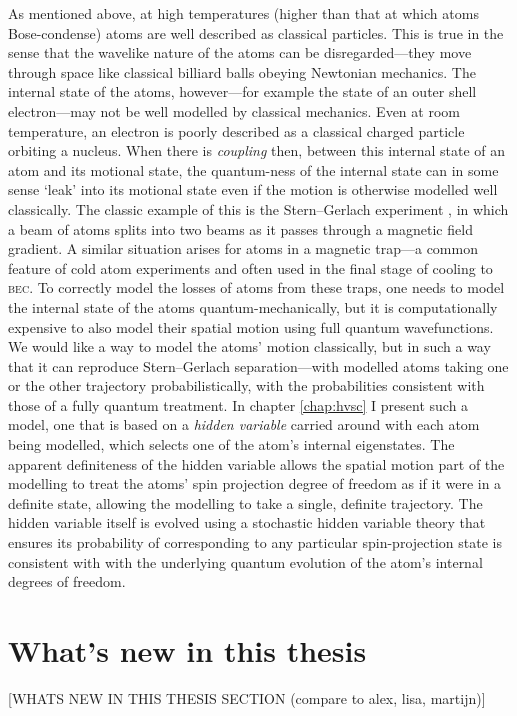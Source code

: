 As mentioned above, at high temperatures (higher than that at which atoms Bose-condense) atoms are well described as classical particles. This is true in the sense that the wavelike nature of the atoms can be disregarded---they move through space like classical billiard balls obeying Newtonian mechanics. The internal state of the atoms, however---for example the state of an outer shell electron---may not be well modelled by classical mechanics. Even at room temperature, an electron is poorly described as a classical charged particle orbiting a nucleus. When there is \emph{coupling} then, between this internal state of an atom and its motional state, the quantum-ness of the internal state can in some sense `leak' into its motional state even if the motion is otherwise modelled well classically. The classic example of this is the Stern--Gerlach experiment \cite{gerlach_experimentelle_1922}, in which a beam of atoms splits into two beams as it passes through a magnetic field gradient. A similar situation arises for atoms in a magnetic trap---a common feature of cold atom experiments and often used in the final stage of cooling to \textsc{bec}. To correctly model the losses of atoms from these traps, one needs to model the internal state of the atoms quantum-mechanically, but it is computationally expensive to also model their spatial motion using full quantum wavefunctions. We would like a way to model the atoms' motion classically, but in such a way that it can reproduce Stern--Gerlach separation---with modelled atoms taking one or the other trajectory probabilistically, with the probabilities consistent with those of a fully quantum treatment. In chapter \ref{chap:hvsc} I present such a model, one that is based on a \emph{hidden variable} carried around with each atom being modelled, which selects one of the atom's internal eigenstates. The apparent definiteness of the hidden variable allows the spatial motion part of the modelling to treat the atoms' spin projection degree of freedom as if it were in a definite state, allowing the modelling to take a single, definite trajectory. The hidden variable itself is evolved using a stochastic hidden variable theory that ensures its probability of corresponding to any particular spin-projection state is consistent with with the underlying quantum evolution of the atom's internal degrees of freedom.

\section{What's new in this thesis}

[WHATS NEW IN THIS THESIS SECTION (compare to alex, lisa, martijn)]